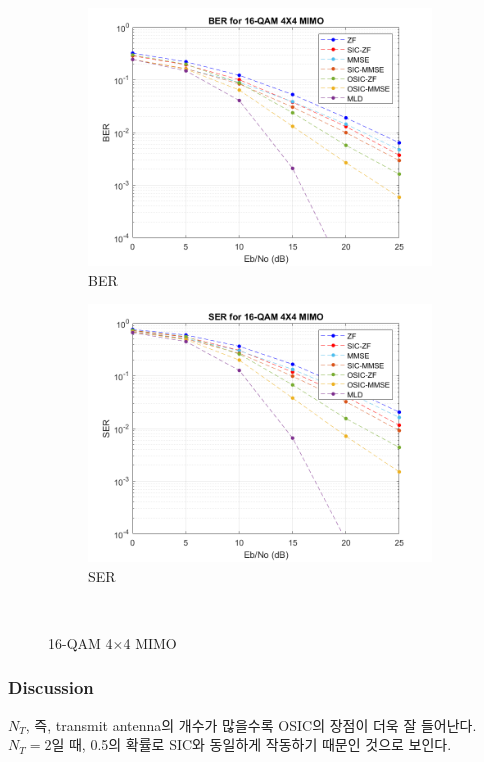 \documentclass{article}
\begin{document}
\begin{figure}[H]
	\centering
	\begin{subfigure}{0.5\textwidth}
		\centerline{\includegraphics[width=1\textwidth]{BER_4x4_16qam2.png}}
		\caption{BER}
	\end{subfigure}%
	\begin{subfigure}{0.5\textwidth}
		\centerline{\includegraphics[width=1\textwidth]{SER_4x4_16qam2.png}}
		\caption{SER}
	\end{subfigure}\\%
	\caption{16-QAM 4$\times$4 MIMO}
\end{figure}
\subsubsection{Discussion}
$N_T$, 즉, transmit antenna의 개수가 많을수록  OSIC의 장점이 더욱 잘 들어난다. $N_T=2$일 때, 0.5의 확률로 SIC와 동일하게 작동하기 때문인 것으로 보인다.
\end{document}
